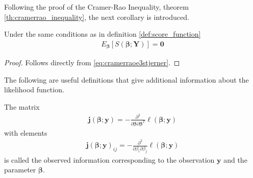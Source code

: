 Following the proof of the Cramer-Rao Inequality, theorem \ref{th:cramerrao_inequality}, the next corollary is introduced.
\begin{corollary}
Under the same conditions as in definition \ref{def:score_function}
\begin{align} \label{eq:corollary}
    E_{\boldsymbol{\beta}}[S(\boldsymbol{\beta}; \textbf{Y})] = \textbf{0}
\end{align}
\end{corollary}
\begin{proof}
Follows directly from \eqref{eq:cramerraoe3stjerner}.
\end{proof}
The following are useful definitions that give additional information about the likelihood function.
\begin{definition} 
\label{def:observed_information}
The matrix
\begin{align} \label{eq:Observed_information}
    \textbf{j}(\boldsymbol{\beta};\textbf{y}) = - \frac{\partial^2}{\partial \boldsymbol{\beta} \partial \boldsymbol{\beta}^T} \ell(\boldsymbol{\beta}; \textbf{y})
\end{align}
with elements
\begin{align*}
    \textbf{j}(\boldsymbol{\beta};\textbf{y})_{ij} = - \frac{\partial^2}{\partial \beta_i \partial \beta_j} \ell(\boldsymbol{\beta}; \textbf{y})
\end{align*}
is called the observed information corresponding to the observation $\textbf{y}$ and the parameter $\boldsymbol{\beta}$.
\end{definition}

